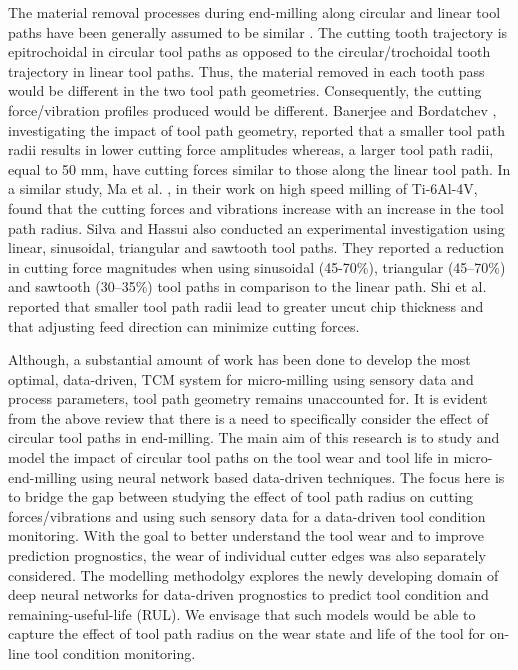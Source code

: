 \documentclass[preprint,review,12pt]{elsarticle}
\begin{document}
The material removal processes during end-milling along circular and linear tool paths have been generally assumed to be similar \cite{CITE1}. The cutting tooth trajectory is epitrochoidal in circular tool paths as opposed to the circular/trochoidal tooth trajectory in linear tool paths. Thus, the material removed in each tooth pass would be different in the two tool path geometries. Consequently, the cutting force/vibration profiles produced would be different. Banerjee and Bordatchev \cite{CITE1}, investigating the impact of tool path geometry, reported that a smaller tool path radii results in lower cutting force amplitudes whereas, a larger tool path radii, equal to 50 mm, have cutting forces similar to those along the linear tool path. In a similar study, Ma et al. \cite{CITE11}, in their work on high speed milling of Ti-6Al-4V, found that the cutting forces and vibrations increase with an increase in the tool path radius. Silva and Hassui \cite{CITE12} also conducted an experimental investigation using linear, sinusoidal, triangular and sawtooth tool paths. They reported a reduction in cutting force magnitudes when using sinusoidal (45-70\%), triangular (45–70\%) and sawtooth (30–35\%) tool paths in comparison to the linear path. Shi et al. \cite{CITE13} reported that smaller tool path radii lead to greater uncut chip thickness and that adjusting feed direction can minimize cutting forces. \par

Although, a substantial amount of work has been done to develop the most optimal, data-driven, TCM system for micro-milling using sensory data and process parameters, tool path geometry remains unaccounted for. It is evident from the above review that there is a need to specifically consider the effect of circular tool paths in end-milling. The main aim of this research is to study and model the impact of circular tool paths on the tool wear and tool life in micro-end-milling using neural network based data-driven techniques. The focus here is to bridge the gap between studying the effect of tool path radius on cutting forces/vibrations and using such sensory data for a data-driven tool condition monitoring. With the goal to better understand the tool wear and to improve prediction prognostics, the wear of individual cutter edges was also separately considered. The modelling methodolgy explores the newly developing domain of deep neural networks for data-driven prognostics to predict tool condition and remaining-useful-life (RUL). We envisage that such models would be able to capture the effect of tool path radius on the wear state and life of the tool for on-line tool condition monitoring. \par
\end{document}
